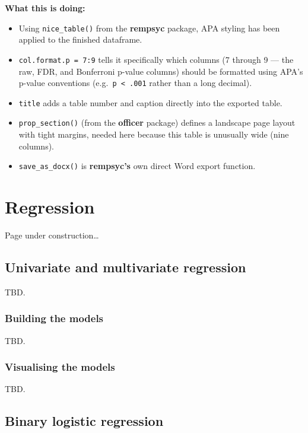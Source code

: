 \documentclass[
  letterpaper,
  DIV=11,
  numbers=noendperiod]{scrreprt}
\begin{document}
\textbf{What this is doing:}

\begin{itemize}
\item
  Using \texttt{nice\_table()} from the \textbf{rempsyc} package, APA
  styling has been applied to the finished dataframe.
\item
  \texttt{col.format.p\ =\ 7:9} tells it specifically which columns (7
  through 9 --- the raw, FDR, and Bonferroni p-value columns) should be
  formatted using APA's p-value conventions
  (e.g.~\texttt{p\ \textless{}\ .001} rather than a long decimal).
\item
  \texttt{title} adds a table number and caption directly into the
  exported table.
\item
  \texttt{prop\_section()} (from the \textbf{officer} package) defines a
  landscape page layout with tight margins, needed here because this
  table is unusually wide (nine columns).
\item
  \texttt{save\_as\_docx()} is \textbf{rempsyc's} own direct Word export
  function.
\end{itemize}

\chapter{Regression}\label{regression}

Page under construction\ldots{} 🚧

\section{Univariate and multivariate
regression}\label{univariate-and-multivariate-regression}

TBD.

\subsection{Building the models}\label{building-the-models-1}

TBD.

\subsection{Visualising the models}\label{visualising-the-models}

TBD.

\section{Binary logistic regression}\label{binary-logistic-regression}
\end{document}
